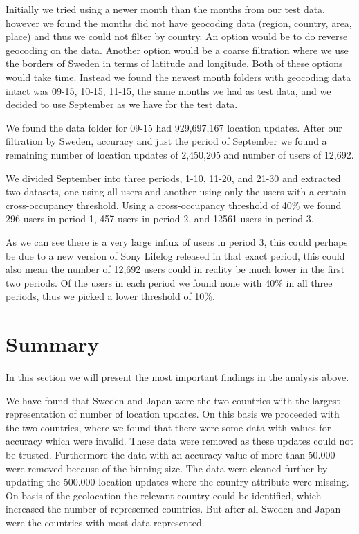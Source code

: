 Initially we tried using a newer month than the months from our test data, however we found the months did not have geocoding data (region, country, area, place) and thus we could not filter by country. An option would be to do reverse geocoding on the data. Another option would be a coarse filtration where we use the borders of Sweden in terms of latitude and longitude. Both of these options would take time. Instead we found the newest month folders with geocoding data intact was 09-15, 10-15, 11-15, the same months we had as test data, and we decided to use September as we have for the test data.

We found the data folder for 09-15 had 929,697,167 location updates. After our filtration by Sweden, accuracy and just the period of September we found a remaining number of location updates of 2,450,205 and number of users of 12,692.

We divided September into three periods, 1-10, 11-20, and 21-30 and extracted two datasets, one using all users and another using only the users with a certain cross-occupancy threshold. Using a cross-occupancy threshold of 40\% we found 296 users in period 1, 457 users in period 2, and 12561 users in period 3.

As we can see there is a very large influx of users in period 3, this could perhaps be due to a new version of Sony Lifelog released in that exact period, this could also mean the number of 12,692 users could in reality be much lower in the first two periods. Of the users in each period we found none with 40\% in all three periods, thus we picked a lower threshold of 10\%.




\section{Summary}
In this section we will present the most important findings in the analysis above. 

We have found that Sweden and Japan were the two countries with the largest representation of number of location updates.  On this basis we proceeded with the two countries, where we found that there were some data with values for accuracy which were invalid. These data were removed as these updates could not be trusted. Furthermore the data with an accuracy value of more than 50.000 were removed because of the binning size. 
The data were cleaned further by updating the 500.000 location updates where the country attribute were missing. On basis of the geolocation the relevant country could be identified, which increased the number of represented countries. But after all Sweden and Japan were the countries with most data represented. 


